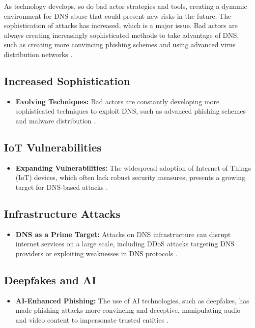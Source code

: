 As technology develops, so do bad actor strategies and tools, creating a dynamic environment for DNS abuse that could present new risks in the future. The sophistication of attacks has increased, which is a major issue. Bad actors are always creating increasingly sophisticated methods to take advantage of DNS, such as creating more convincing phishing schemes and using advanced virus distribution networks \cite{icann2022dnsabusetrends}.

\subsection{Increased Sophistication}
\begin{itemize}
    \item \textbf{Evolving Techniques:} Bad actors are constantly developing more sophisticated techniques to exploit DNS, such as advanced phishing schemes and malware distribution \cite{wrightson2014advanced}.
\end{itemize}

\subsection{IoT Vulnerabilities}
\begin{itemize}
    \item \textbf{Expanding Vulnerabilities:} The widespread adoption of Internet of Things (IoT) devices, which often lack robust security measures, presents a growing target for DNS-based attacks \cite{mahmoud2015internet}.
\end{itemize}

\subsection{Infrastructure Attacks}
\begin{itemize}
    \item \textbf{DNS as a Prime Target:} Attacks on DNS infrastructure can disrupt internet services on a large scale, including DDoS attacks targeting DNS providers or exploiting weaknesses in DNS protocols \cite{dooley2017dns}.
\end{itemize}

\subsection{Deepfakes and AI}
\begin{itemize}
    \item \textbf{AI-Enhanced Phishing:} The use of AI technologies, such as deepfakes, has made phishing attacks more convincing and deceptive, manipulating audio and video content to impersonate trusted entities \cite{schick2020deep}.
\end{itemize}

